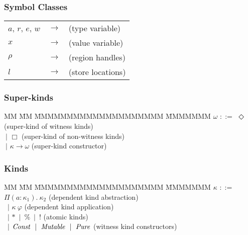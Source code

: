 
\bigskip
\subsubsection{Symbol Classes}
\vspace{-1ex}
\begin{tabular}{lll}
$a$, $r$, $e$, $w$	& $\rightarrow$ &  (type variable)  \\
$x$			& $\rightarrow$ &  (value variable)  \\
$\rho$			& $\rightarrow$ &  (region handles) \\
$l$			& $\rightarrow$ &  (store locations) 
\end{tabular}

\vspace{-1em}
\subsubsection{Super-kinds}
\vspace{-1ex}
\begin{tabbing}
MM 	\= MM \= MMMMMMMMMMMMMMMMMMMM \= MMMMMMM \kill
$\omega$ 
	\> $::=$ 	\> $\Diamond$						\> (super-kind of witness kinds) \\
	\> $\ |$	\> $\Box$						\> (super-kind of non-witness kinds) \\
	\> $\ |$	\> $\kappa \to \omega$ 					\> (super-kind constructor) 
\end{tabbing}

\vspace{-2em}
\subsubsection{Kinds}
\vspace{-1ex}
\begin{tabbing}
MM 	\= MM \= MMMMMMMMMMMMMMMMMMMM \= MMMMMMM \kill
$\kappa$ 
	\> $::=$ 	\> $\Pi(a : \kappa_1) . \ \kappa_2$ 		  	
			\> (dependent kind abstraction)	
	\\
	\> \ $\mid$	\> $\kappa \ \varphi$ 		 			
			\> (dependent kind application)	
	\\
 	\> \ $\mid$	\> $* \ \mid \ \% \ \mid \ !$ 			
			\> (atomic kinds) 
	\\
	\> \ $\mid$	\> $\iConst \ \mid \ \iMutable \ \mid \ \iPure$ 
			\> (witness kind constructors)
\end{tabbing}

\vspace{-2em}
